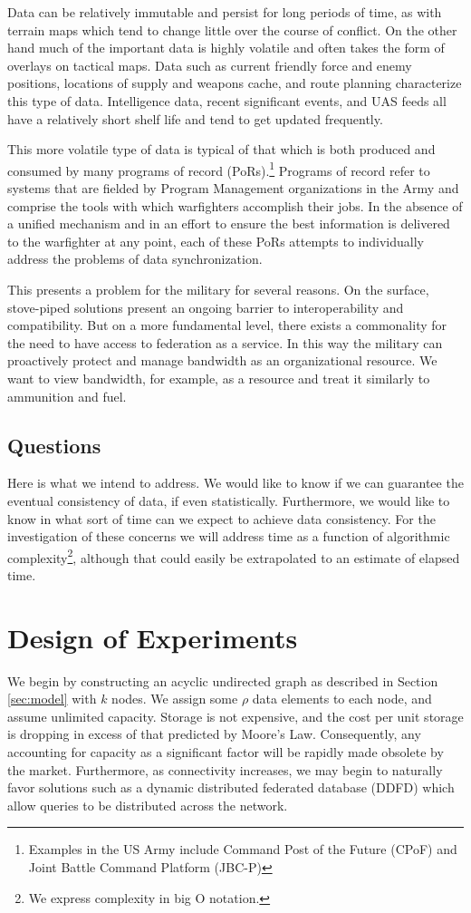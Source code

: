 \documentclass[10pt]{./IEEEtran}
\begin{document}
Data can be relatively immutable and persist for long periods of time, as with terrain maps which tend to change little over the course of conflict.  On the other hand much of the important data is highly volatile and often takes the form of overlays on tactical maps.  Data such as current friendly force and enemy positions, locations of supply and weapons cache, and route planning characterize this type of data.  Intelligence data, recent significant events, and UAS feeds all have a relatively short shelf life and tend to get updated frequently.

This more volatile type of data is typical of that which is both produced and consumed by many programs of record (PoRs).\footnote{Examples in the US Army include Command Post of the Future (CPoF) and Joint Battle Command Platform (JBC-P)}  Programs of record refer to systems that are fielded by Program Management organizations in the Army and comprise the tools with which warfighters accomplish their jobs.  In the absence of a unified mechanism and in an effort to ensure the best information is delivered to the warfighter at any point, each of these PoRs attempts to individually address the problems of data synchronization.

This presents a problem for the military for several reasons.  On the surface, stove-piped solutions present an ongoing barrier to interoperability and compatibility.  But on a more fundamental level, there exists a commonality for the need to have access to federation as a service.  In this way the military can proactively protect and manage bandwidth as an organizational resource.  We want to view bandwidth, for example, as a resource and treat it similarly to ammunition and fuel.


\subsection{Questions}
Here is what we intend to address.  We would like to know if we can guarantee the eventual consistency of data, if even statistically.  Furthermore, we would like to know in what sort of time can we expect to achieve data consistency. For the investigation of these concerns we will address time as a function of algorithmic complexity\footnote{We express complexity in big O notation.}, although that could easily be extrapolated to an estimate of elapsed time.


\section{Design of Experiments}
\label{sec:doe}
We begin by constructing an acyclic undirected graph as described in Section \ref{sec:model} with $k$ nodes.  We assign some $\rho$ data elements to each node, and assume unlimited capacity.  Storage is not expensive, and the cost per unit storage is dropping in excess of that predicted by Moore's Law.  Consequently, any accounting for capacity as a significant factor will be rapidly made obsolete by the market.  Furthermore, as connectivity increases, we may begin to naturally favor solutions such as a dynamic distributed federated database (DDFD) which allow queries to be distributed across the network\cite{Bent2009}.
\end{document}
